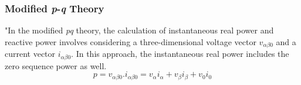 \subsubsection{Modified \textit{p}-\textit{q} Theory \cite{akagi1999theory, SrinivasBhaskar}}
 \vspace*{-0.5cm}
 "In the modified \textit{pq} theory, the calculation of instantaneous real power and reactive power involves considering a three-dimensional voltage vector $v_{\alpha \beta 0}$ and a current vector $i_{\alpha \beta 0}$. In this approach, the instantaneous real power includes the zero sequence power as well. 
 \begin{equation}
 p=v_{\alpha \beta 0} . i_{\alpha \beta 0} = v_\alpha i_\alpha + v_\beta i_\beta + v_0 i_0
\label{eqn2.20}
\end{equation}

